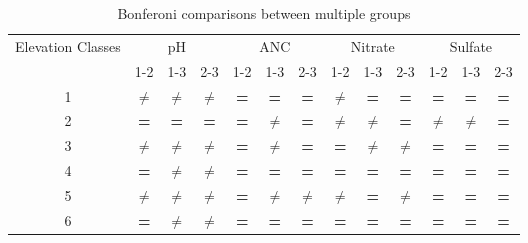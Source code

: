 \begin{table}[htbp]
\caption{Bonferoni comparisons between multiple groups}
\begin{center}
\begin{tabular}{p{2cm}cccccccccccc}
\toprule
 Elevation Classes& \multicolumn{ 3}{c}{pH} & \multicolumn{ 3}{c}{ANC} & \multicolumn{ 3}{c}{Nitrate} & \multicolumn{ 3}{c}{Sulfate} \\ \cline{2-13}\noalign{\smallskip}
 & \multicolumn{ 1}{c}{1-2} & 1-3 & 2-3 & 1-2 & 1-3 & 2-3 & 1-2 & 1-3 & 2-3 & 1-2 & 1-3 & 2-3 \\  \cline{2-13}
\multicolumn{1}{c}{1} & \textbf{$\neq$} & \textbf{$\neq$} & \textbf{$\neq$} & \textbf{=} & \textbf{=} & \textbf{=} & \textbf{$\neq$} & \textbf{=} & \textbf{=} & \textbf{=} & \textbf{=} & \textbf{=} \\ 
\multicolumn{1}{c}{2} & \textbf{=} & \textbf{=} & \textbf{=} & \textbf{=} & \textbf{$\neq$} & \textbf{=} & \textbf{$\neq$} & \textbf{$\neq$} & \textbf{=} & \textbf{$\neq$} & \textbf{$\neq$} & \textbf{=} \\ 
\multicolumn{1}{c}{3} & \textbf{$\neq$} & \textbf{$\neq$} & \textbf{$\neq$} & \textbf{=} & \textbf{$\neq$} & \textbf{=} & \textbf{=} & \textbf{$\neq$} & \textbf{$\neq$} & \textbf{=} & \textbf{=} & \textbf{=} \\ 
\multicolumn{1}{c}{4} & \textbf{=} & \textbf{$\neq$} & \textbf{$\neq$} & \textbf{=} & \textbf{=} & \textbf{=} & \textbf{=} & \textbf{=} & \textbf{=} & \textbf{=} & \textbf{=} & \textbf{=} \\ 
\multicolumn{1}{c}{5} & \textbf{$\neq$} & \textbf{$\neq$} & \textbf{$\neq$} & \textbf{=} & \textbf{$\neq$} & \textbf{$\neq$} & \textbf{$\neq$} & \textbf{=} & \textbf{$\neq$} & \textbf{=} & \textbf{=} & \textbf{=} \\ 
\multicolumn{1}{c}{6} & \textbf{=} & \textbf{$\neq$} & \textbf{$\neq$} & \textbf{=} & \textbf{=} & \textbf{=} & \textbf{=} & \textbf{=} & \textbf{=} & \textbf{=} & \textbf{=} & \textbf{=} \\ 
\bottomrule
\end{tabular}
\end{center}
\label{tab:Bontable}
\end{table}
